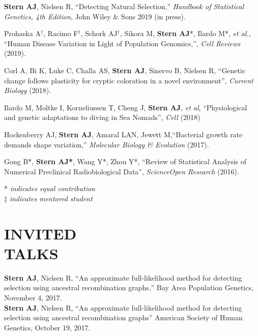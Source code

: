 \documentclass[margin, 10pt]{res} %
\begin{document}
\begin{resume}
{\bf Stern AJ}, Nielsen R, ``Detecting Natural Selection,'' {\it Handbook of Statistical Genetics, 4th Edition},  John Wiley \& Sons 2019 (in press).

Prohaska A$^\dag$, Racimo F$^\dag$, Schork AJ$^\dag$, Sikora M, {\bf Stern AJ}*, Ilardo M*, {\it et al.}, ``Human Disease Variation in Light of Population Genomics,'',  {\it Cell Reviews} (2019).

Corl A, Bi K, Luke C, Challa AS, {\bf Stern AJ}, Sinervo B, Nielsen R, ``Genetic change follows plasticity for cryptic coloration in a novel environment'', {\it Current Biology} (2018).

Ilardo M, Moltke I, Korneliussen T, Cheng J, {\bf Stern AJ}, {\it et al}, ``Physiological and genetic adaptations to diving in Sea Nomads'', {\it Cell} (2018)

Hockenberry AJ, {\bf Stern AJ}, Amaral LAN, Jewett M,``Bacterial growth rate demands shape variation,'' {\it Molecular Biology \& Evolution} (2017).

Gong B*, {\bf Stern AJ*}, Wang Y*, Zhou Y*, ``Review of Statistical Analysis of Numerical Preclinical Radiobiological Data'', {\it ScienceOpen Research} (2016). 


* {\it indicates equal contribution}\\
$\ddag$ {\it indicates mentored student}


\section{INVITED\\TALKS}
{\bf Stern AJ}, Nielsen R, ``An approximate full-likelihood method for detecting selection using ancestral recombination graphs,'' Bay Area Population Genetics, November 4, 2017.\\
{\bf Stern AJ}, Nielsen R, ``An approximate full-likelihood method for detecting selection using ancestral recombination graphs'' American Society of Human Genetics, October 19, 2017.


\end{resume}
\end{document}

